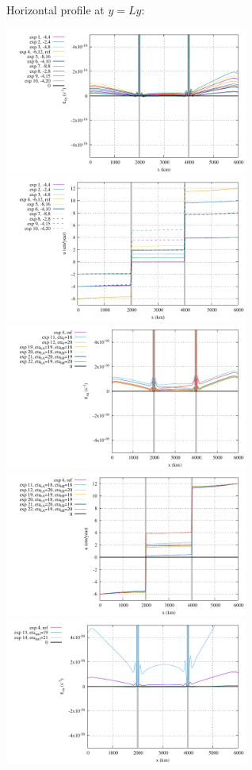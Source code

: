 \newpage

Horizontal profile at $y=Ly$:

\begin{center}
\includegraphics[width=8cm]{python_codes/fieldstone_148/results/fig1_exx_surface}
\includegraphics[width=8cm]{python_codes/fieldstone_148/results/fig1_u_surface}\\
\includegraphics[width=8cm]{python_codes/fieldstone_148/results/fig2_exx_surface}
\includegraphics[width=8cm]{python_codes/fieldstone_148/results/fig2_u_surface}\\
\includegraphics[width=8cm]{python_codes/fieldstone_148/results/fig3_exx_surface}

\end{center}
